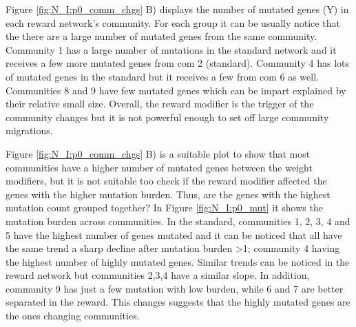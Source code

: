 Figure \ref{fig:N_I:p0_comm_chgs} B) displays the number of mutated genes (Y) in each reward network's community. For each group it can be usually notice that the there are a large number of mutated genes from the same community. Community 1 has a large number of mutations in the standard network and it receives a few more mutated genes from com 2 (standard). Community 4 has lots of mutated genes in the standard but it receives a few from com 6 as well. Communities 8 and 9 have few mutated genes which can be impart explained by their relative small size. Overall, the reward modifier is the trigger of the community changes but it is not powerful enough to set off large community migrations.

% 
Figure \ref{fig:N_I:p0_comm_chgs} B) is a suitable plot to show that most communities have a higher number of mutated genes between the weight modifiers, but it is not suitable too check if the reward modifier affected the genes with the higher mutation burden. Thus, are the genes with the highest mutation count grouped together? In Figure \ref{fig:N_I:p0_mut} it shows the mutation burden across communities. In the standard, communities 1, 2, 3, 4 and 5 have the highest number of genes mutated and it can be noticed that all have the same trend a sharp decline after mutation burden >1; community 4 having the highest number of highly mutated genes. Similar trends can be noticed in the reward network but communities 2,3,4 have a similar slope. In addition, community 9 has just a few mutation with low burden, while 6 and 7 are better separated in the reward. This changes suggests that the highly mutated genes are the ones changing communities.



